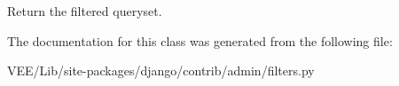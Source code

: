 \begin{DoxyVerb}Return the filtered queryset.
\end{DoxyVerb}
 

The documentation for this class was generated from the following file\+:\begin{DoxyCompactItemize}
\item 
V\+E\+E/\+Lib/site-\/packages/django/contrib/admin/filters.\+py\end{DoxyCompactItemize}
